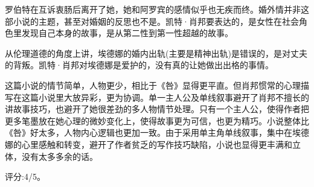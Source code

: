 罗伯特在互诉衷肠后离开了她，她和阿罗宾的感情似乎也无疾而终。婚外情并非这部小说的主题，甚至对婚姻的反思也不是。凯特·肖邦要表达的，是女性在社会角色里发现自己本身的故事，是从第二性到第一性超越的故事。

从伦理道德的角度上讲，埃德娜的婚内出轨(主要是精神出轨)是错误的，是对丈夫的背叛。凯特·肖邦对埃德娜是爱护的，没有真的让她做出出格的事情。

这篇小说的情节简单，人物更少，相比于《咎》显得更平直。但肖邦惯常的心理描写在这篇小说里大放异彩，更为协调。单一主人公及单线叙事避开了肖邦不擅长的讲故事技巧，也避开了她很差劲的多人物情节处理。只有一个主人公，使得作者把更多笔墨放在她心理的微妙变化上，使得故事更为可信，也更为精巧。小说整体比《咎》好太多，人物内心逻辑也更加一致。由于采用单主角单线叙事，集中在埃德娜的心里感触和转变，避开了作者贫乏的写作技巧缺陷，小说也显得更丰满和立体，没有太多多余的话。

评分:4/5。